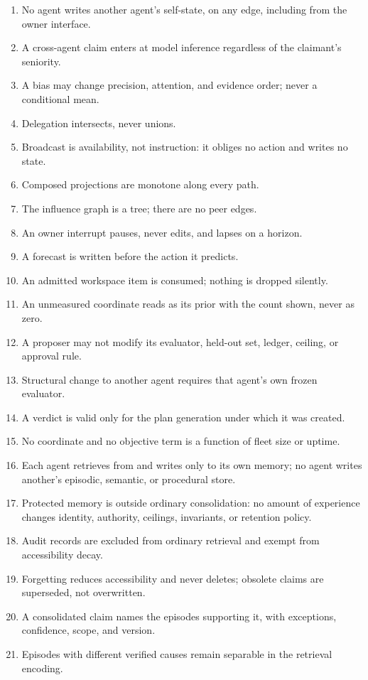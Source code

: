\documentclass[11pt]{article}
\begin{document}
\begin{enumerate}[leftmargin=1.8em,itemsep=2pt]
\item No agent writes another agent's self-state, on any edge, including from the owner interface.
\item A cross-agent claim enters at model inference regardless of the claimant's seniority.
\item A bias may change precision, attention, and evidence order; never a conditional mean.
\item Delegation intersects, never unions.
\item Broadcast is availability, not instruction: it obliges no action and writes no state.
\item Composed projections are monotone along every path.
\item The influence graph is a tree; there are no peer edges.
\item An owner interrupt pauses, never edits, and lapses on a horizon.
\item A forecast is written before the action it predicts.
\item An admitted workspace item is consumed; nothing is dropped silently.
\item An unmeasured coordinate reads as its prior with the count shown, never as zero.
\item A proposer may not modify its evaluator, held-out set, ledger, ceiling, or approval rule.
\item Structural change to another agent requires that agent's own frozen evaluator.
\item A verdict is valid only for the plan generation under which it was created.
\item No coordinate and no objective term is a function of fleet size or uptime.
\item Each agent retrieves from and writes only to its own memory; no agent writes another's episodic, semantic, or procedural store.
\item Protected memory is outside ordinary consolidation: no amount of experience changes identity, authority, ceilings, invariants, or retention policy.
\item Audit records are excluded from ordinary retrieval and exempt from accessibility decay.
\item Forgetting reduces accessibility and never deletes; obsolete claims are superseded, not overwritten.
\item A consolidated claim names the episodes supporting it, with exceptions, confidence, scope, and version.
\item Episodes with different verified causes remain separable in the retrieval encoding.
\end{enumerate}



\end{document}
